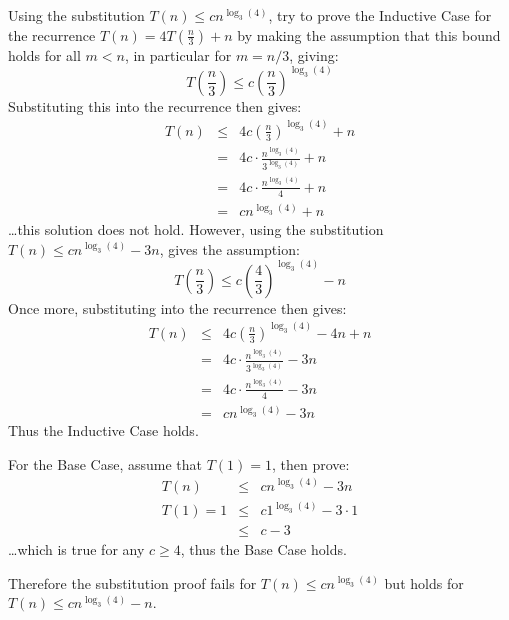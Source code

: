 Using the substitution $T(n) \leq cn^{\log_3(4)}$, try to prove the Inductive Case for the recurrence $T(n) = 4T(\frac{n}{3}) + n$ by making the assumption that this bound holds for all $m < n$, in particular for $m = n/3$, giving:
\begin{equation*}
	T\left(\frac{n}{3}\right) \leq c\left(\frac{n}{3}\right)^{\log_3(4)}
\end{equation*}
Substituting this into the recurrence then gives:
\begin{eqnarray*}
	T(n) &\leq& 4c\left(\frac{n}{3}\right)^{\log_3(4)} + n \\
	 &=& 4c \cdot \frac{n^{\log_3(4)}}{3^{\log_3(4)}} + n \\
	 &=& 4c \cdot \frac{n^{\log_3(4)}}{4} + n \\
	 &=& cn^{\log_3(4)} + n
\end{eqnarray*}
\ldots this solution does not hold. However, using the substitution $T(n) \leq cn^{\log_3(4)} - 3n$, gives the assumption:
\begin{equation*}
	T\left(\frac{n}{3}\right) \leq c\left(\frac{4}{3}\right)^{\log_3(4)} - n
\end{equation*}
Once more, substituting into the recurrence then gives:
\begin{eqnarray*}
	T(n) &\leq& 4c\left(\frac{n}{3}\right)^{\log_3(4)} - 4n + n \\
	 &=& 4c \cdot \frac{n^{\log_3(4)}}{3^{\log_3(4)}} - 3n \\
	 &=& 4c \cdot \frac{n^{\log_3(4)}}{4} - 3n \\
	 &=& cn^{\log_3(4)} - 3n
\end{eqnarray*}
Thus the Inductive Case holds.

For the Base Case, assume that $T(1) = 1$, then prove:
\begin{eqnarray*}
	T(n) &\leq& cn^{\log_3(4)} - 3n \\
	T(1) = 1 &\leq& c1^{\log_3(4)} - 3\cdot1 \\
	 &\leq& c - 3
\end{eqnarray*}
\ldots which is true for any $c \geq 4$, thus the Base Case holds.

Therefore the substitution proof fails for $T(n) \leq cn^{\log_3(4)}$ but holds for $T(n) \leq cn^{\log_3(4)} - n$.
